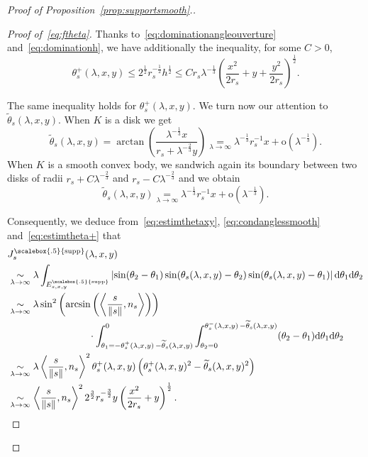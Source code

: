 \documentclass[AHL,Unicode,longabstracts,published]{cedram}
\newcommand{\dd}{\mathrm{d}}
\newcommand{\od}{\mathrm{o}}
\DeclareMathOperator{\supp}{\scalebox{.5}{supp}}
\newcommand{\noi}{\noindent}
\newenvironment*{prooff}{\begin{proof}}{\let\qed\relax\end{proof}}
\begin{document}
\begin{proof}[{Proof of Proposition~\ref{prop:supportsmooth}.}]
\begin{prooff}[{Proof of~\eqref{eq:ftheta}}]
Thanks to~\eqref{eq:dominationangleouverture} and~\eqref{eq:dominationh}, we have additionally the inequality, for some $C>0$,
\begin{equation}\label{eq:dominationtheta+}
\theta_s^+(\lambda,x,y)\le 2^{\frac1{2}}r_s^{-\frac1{2}}h^{\frac1{2}}\le C r_s\lambda^{-\frac1{3}}\left(\frac{x^2}{2r_s}+y+\frac{y^2}{2r_s}\right)^{\frac1{2}}.
\end{equation}

The same inequality holds for $\theta_s^+(\lambda,x,y)$. We turn now our attention to $\widetilde{\theta}_s(\lambda,x,y)$. When $K$ is a disk we get
\[
\widetilde{\theta}_s(\lambda,x,y)=\arctan\left(\frac{\lambda^{-\frac1{3}}x}{r_s+\lambda^{-\frac{2}{3}}y}\right)
\underset{\lambda\to\infty}{=}\lambda^{-\frac1{3}}r_s^{-1}x+ \od\left(\lambda^{-\frac13}\right).
\]
When $K$ is a smooth convex body, we sandwich again its boundary between two disks of radii $r_s+C\lambda^{-\frac{2}{3}}$ and $r_s-C\lambda^{-\frac{2}{3}}$ and we obtain
\begin{equation*}\label{eq:estimtildetheta}
\widetilde{\theta}_s(\lambda,x,y)\underset{\lambda\to\infty}{=}\lambda^{-\frac1{3}}r_s^{-1}x+\od\left(\lambda^{-\frac13}\right).
\end{equation*}

Consequently, we deduce from~\eqref{eq:estimthetaxy}, \eqref{eq:condanglessmooth} and~\eqref{eq:estimtheta+} that
\begin{align}
&J^{\supp}_{s}(\lambda,x,y)\nonumber\\
& \underset{\lambda\to\infty}{\sim} \lambda\int_{E^{\supp}_{s,x,y}}\left|\sin(\theta_2-\theta_1)\sin(\theta_s(\lambda,x,y)-\theta_2)\sin(\theta_s(\lambda,x,y)-\theta_1)\right|
\dd \theta_1\dd \theta_2\nonumber \\
& \underset{\lambda\to\infty}{\sim}\lambda\sin^2\left(\arcsin\left(\left\langle\frac{s}{\|s\|},n_s\right\rangle\right)\right)\nonumber\\
&\mkern150mu \cdot \int_{\theta_1=-\theta_s^+(\lambda,x,y)\,-\widetilde{\theta}_s(\lambda,x,y)}^{0}
\int_{\theta_2=0}^{\theta_s^-(\lambda,x,y)\,-\widetilde{\theta}_s(\lambda,x,y)} (\theta_2-\theta_1)\dd \theta_1 \dd\theta_2\nonumber\\
& \underset{\lambda\to\infty}{\sim} \lambda \left\langle \frac{s}{\|s\|},n_s\right\rangle^2 \theta_s^+(\lambda,x,y)\left(\theta_s^+(\lambda,x,y)^2-\widetilde{\theta}_s(\lambda,x,y)^2\right)\nonumber\\
& \underset{\lambda\to\infty}{\sim} \left\langle \frac{s}{\|s\|},n_s\right\rangle^2 2^{\frac{3}{2}}r_s^{-\frac{3}{2}}y\left(\frac{x^2}{2r_s}+y\right)^{\frac1{2}}\label{eq:intangles}.
\end{align}



\end{prooff}
\end{proof}
\end{document}
